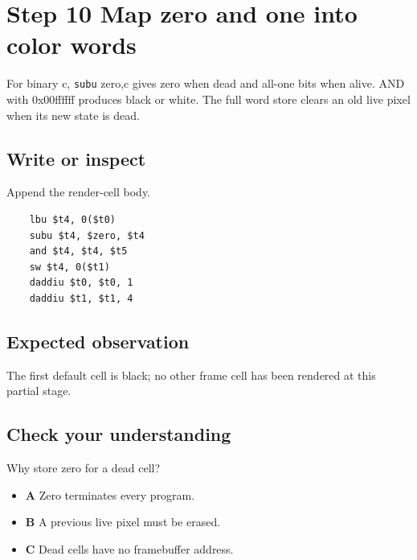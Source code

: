\section{Step 10 Map zero and one into color
  words}\label{008-life-generations-s10-step-10-map-zero-and-one-into-color-words}

For binary c, \texttt{subu} zero,c gives zero when dead and all-one bits
when alive. AND with 0x00ffffff produces black or white. The full word
store clears an old live pixel when its new state is dead.

\subsection{Write or
  inspect}\label{008-life-generations-s10-write-or-inspect}

Append the render-cell body.

\begin{verbatim}
    lbu $t4, 0($t0)
    subu $t4, $zero, $t4
    and $t4, $t4, $t5
    sw $t4, 0($t1)
    daddiu $t0, $t0, 1
    daddiu $t1, $t1, 4
\end{verbatim}

\subsection{Expected
  observation}\label{008-life-generations-s10-expected-observation}

The first default cell is black; no other frame cell has been rendered
at this partial stage.

\subsection{Check your
  understanding}\label{008-life-generations-s10-check-your-understanding}

Why store zero for a dead cell?

\begin{itemize}
  \tightlist
  \item
        \textbf{A} Zero terminates every program.
  \item
        \textbf{B} A previous live pixel must be erased.
  \item
        \textbf{C} Dead cells have no framebuffer address.
\end{itemize}
